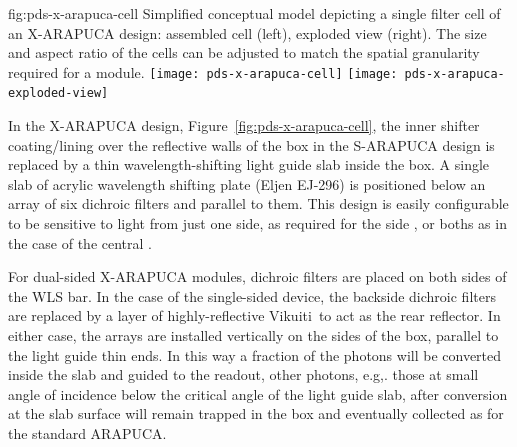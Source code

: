  \begin{dunefigure}{fig:pds-x-arapuca-cell}
{Simplified conceptual model depicting a single filter cell of an X-ARAPUCA design: assembled cell (left),  exploded view (right). The size and aspect ratio of the cells can be adjusted to match the spatial granularity required for a  module.}
  \texttt{[image: pds-x-arapuca-cell]}
  \texttt{[image: pds-x-arapuca-exploded-view]}
\end{dunefigure}

In the X-ARAPUCA design, Figure~\ref{fig:pds-x-arapuca-cell}, the inner shifter coating/lining over the reflective walls of the box in the  S-ARAPUCA design is replaced by a thin wavelength-shifting light guide slab inside the box.  A single slab of acrylic wavelength shifting plate (Eljen EJ-296) is positioned below an array of six dichroic filters and parallel to them. 
This design is easily configurable to be sensitive to light from just one side, as required for the side , or boths as in the case of the central . 

For dual-sided X-ARAPUCA modules, dichroic filters are placed on both sides of the WLS bar.  In the case of the single-sided device, the backside dichroic filters are replaced by a layer of highly-reflective Vikuiti\texttrademark\ to act as the rear reflector.  In either case, the  arrays are installed vertically on the sides of the box, parallel to the light guide thin ends. 
 In this way a fraction of the photons will be converted inside the slab and guided to the readout, other photons,  e.g,. those at small angle of incidence below the critical angle of the light guide slab, after conversion at the slab surface will remain trapped in the box and eventually collected as for the standard ARAPUCA.
 
 
